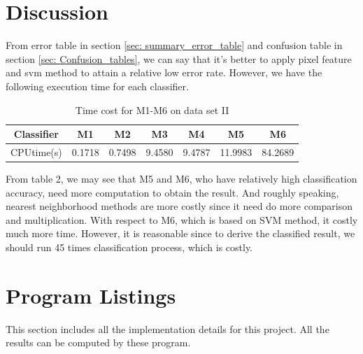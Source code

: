 \documentclass[12pt,letterpaper]{article}
\begin{document}
\section{Discussion}

From error table in section \ref{sec: summary_error_table} and confusion table in section \ref{sec: Confusion_tables}, we can say that it's better to apply pixel feature and svm method to attain a relative low error rate. However, we have the following execution time for each classifier.

\begin{table}[H]
\centering
\begin{tabular}{c || c c c c c c}
    Classifier  &  M1 & M2 & M3 & M4 &M5 &M6 \\
    \hline
    CPUtime(s) & 0.1718 & 0.7498 & 9.4580 & 9.4787 & 11.9983 & 84.2689
\end{tabular}   
\caption{Time cost for M1-M6 on data set II}
\end{table}

From table 2, we may see that M5 and M6, who have relatively high classification accuracy, need more computation to obtain the result. And roughly speaking, nearest neighborhood methods are more costly since it need do more comparison and multiplication. With respect to M6, which is based on SVM method, it costly much more time. However, it is reasonable since to derive the classified result, we should run 45 times classification process, which is costly.

\section{Program Listings}

This section includes all the implementation details for this project. All the results can be computed by these program.






%



%

%
%
%
%



\newpage



\end{document}
